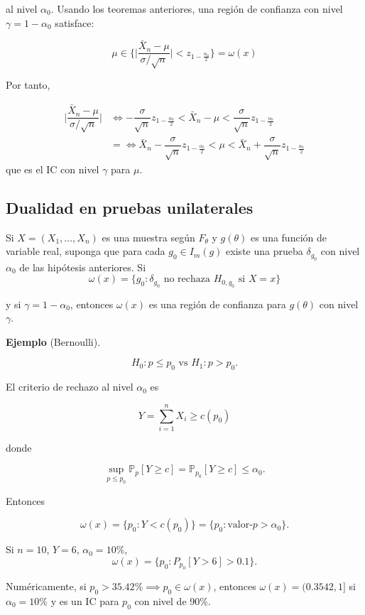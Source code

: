 \documentclass[
  12pt,
]{book}
\begin{document}
al nivel \(\alpha_0\). Usando los teoremas anteriores, una región de confianza con nivel \(\gamma = 1-\alpha_0\) satisface:

\[\mu\in\bigg\{ \bigg|\dfrac{\bar X_n-\mu}{\sigma/\sqrt n}\bigg|< z_{1-\frac{\alpha_0}2}\bigg\} = \omega(x)\]

Por tanto,

\begin{align*}
 \bigg|\dfrac{\bar X_n-\mu}{\sigma/\sqrt n}\bigg| & \Leftrightarrow -\dfrac{\sigma}{\sqrt n}z_{1-\frac{\alpha_0}2}<\bar X_n  - \mu<\dfrac{\sigma}{\sqrt n}z_{1-\frac{\alpha_0}2}\\
 & = \Leftrightarrow \bar X_n-\dfrac{\sigma}{\sqrt n}z_{1-\frac{\alpha_0}2}< \mu<\bar X_n + \dfrac{\sigma}{\sqrt n}z_{1-\frac{\alpha_0}2}
\end{align*}
que es el IC con nivel \(\gamma\) para \(\mu\).

\hypertarget{dualidad-en-pruebas-unilaterales}{%
\subsection{Dualidad en pruebas unilaterales}\label{dualidad-en-pruebas-unilaterales}}

Si \(X = (X_1,\dots, X_n)\) es una muestra según \(F_\theta\) y \(g(\theta)\) es una función de variable real, suponga que para cada \(g_0\in I_m(g)\) existe una prueba \(\delta_{g_0}\) con nivel \(\alpha_0\) de las hipótesis anteriores. Si
\[\omega(x) = \{g_0: \delta_{g_0} \text{ no rechaza }H_{0,g_0}\text{ si }X=x\}\]

y si \(\gamma = 1-\alpha_0\), entonces \(\omega(x)\) es una región de confianza para \(g(\theta)\) con nivel \(\gamma\).

\textbf{Ejemplo} (Bernoulli).

\[ H_0: p \leq p_0 \text{ vs } H_1: p>p_0.\]

El criterio de rechazo al nivel \(\alpha_0\) es

\[Y = \sum_{i=1}^nX_i\geq c(p_0)\]

donde

\[\sup_{p\leq p_0} \mathbb P_p[Y\geq c] = \mathbb P_{p_0}[Y\geq c] \leq \alpha_0.\]

Entonces

\[\omega(x) = \{p_0: Y<c(p_0)\} = \{p_0: \text{valor-}p>\alpha_0\}.\]

Si \(n=10\), \(Y=6\), \(\alpha_0 = 10\%\),
\[\omega(x) =\{p_0: P_{p_0}[Y> 6] >0.1\}.\]

Numéricamente, si \(p_0 > 35.42\% \implies p_0 \in \omega(x)\), entonces \(\omega(x) = (0.3542,1]\) si \(\alpha_0=10\%\) y es un IC para \(p_0\) con nivel de 90\%.
\end{document}
